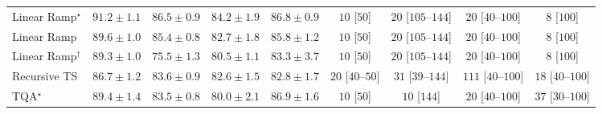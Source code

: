\begin{tabular}{l|cccc|cccc|}
Linear Ramp$^\star$ & {\cellcolor[HTML]{00472A}} \color[HTML]{F1F1F1} $91.2\pm 1.1$ & {\cellcolor[HTML]{026A38}} \color[HTML]{F1F1F1} $86.5\pm 0.9$ & {\cellcolor[HTML]{14783E}} \color[HTML]{F1F1F1} $84.2\pm 1.9$ & {\cellcolor[HTML]{006837}} \color[HTML]{F1F1F1} $86.8\pm 0.9$ & {\cellcolor[HTML]{FFF7F3}} \color[HTML]{000000} $10$ [$50$] & {\cellcolor[HTML]{FFF4F0}} \color[HTML]{000000} $20$ [$105$--$144$] & {\cellcolor[HTML]{FFF4F0}} \color[HTML]{000000} $20$ [$40$--$100$] & {\cellcolor[HTML]{FFF7F3}} \color[HTML]{000000} $8$ [$100$] \\
Linear Ramp & {\cellcolor[HTML]{00532F}} \color[HTML]{F1F1F1} $89.6\pm 1.0$ & {\cellcolor[HTML]{0B713B}} \color[HTML]{F1F1F1} $85.4\pm 0.8$ & {\cellcolor[HTML]{1F8142}} \color[HTML]{F1F1F1} $82.7\pm 1.8$ & {\cellcolor[HTML]{086E3A}} \color[HTML]{F1F1F1} $85.8\pm 1.2$ & {\cellcolor[HTML]{FFF7F3}} \color[HTML]{000000} $10$ [$50$] & {\cellcolor[HTML]{FFF4F0}} \color[HTML]{000000} $20$ [$105$--$144$] & {\cellcolor[HTML]{FFF4F0}} \color[HTML]{000000} $20$ [$40$--$100$] & {\cellcolor[HTML]{FFF7F3}} \color[HTML]{000000} $8$ [$100$] \\
Linear Ramp$^\dagger$ & {\cellcolor[HTML]{005530}} \color[HTML]{F1F1F1} $89.3\pm 1.0$ & {\cellcolor[HTML]{58B669}} \color[HTML]{F1F1F1} $75.5\pm 1.3$ & {\cellcolor[HTML]{2E924C}} \color[HTML]{F1F1F1} $80.5\pm 1.1$ & {\cellcolor[HTML]{1A7D40}} \color[HTML]{F1F1F1} $83.3\pm 3.7$ & {\cellcolor[HTML]{FFF7F3}} \color[HTML]{000000} $10$ [$50$] & {\cellcolor[HTML]{FFF4F0}} \color[HTML]{000000} $20$ [$105$--$144$] & {\cellcolor[HTML]{FFF4F0}} \color[HTML]{000000} $20$ [$40$--$100$] & {\cellcolor[HTML]{FFF7F3}} \color[HTML]{000000} $8$ [$100$] \\
Recursive TS & {\cellcolor[HTML]{016937}} \color[HTML]{F1F1F1} $86.7\pm 1.2$ & {\cellcolor[HTML]{187B3F}} \color[HTML]{F1F1F1} $83.6\pm 0.9$ & {\cellcolor[HTML]{208242}} \color[HTML]{F1F1F1} $82.6\pm 1.5$ & {\cellcolor[HTML]{1F8142}} \color[HTML]{F1F1F1} $82.8\pm 1.7$ & {\cellcolor[HTML]{FFF4F0}} \color[HTML]{000000} $20$ [$40$--$50$] & {\cellcolor[HTML]{FFF2EE}} \color[HTML]{000000} $31$ [$39$--$144$] & {\cellcolor[HTML]{FDE0DD}} \color[HTML]{000000} $111$ [$40$--$100$] & {\cellcolor[HTML]{FFF5F1}} \color[HTML]{000000} $18$ [$40$--$100$] \\
TQA$^\star$ & {\cellcolor[HTML]{005530}} \color[HTML]{F1F1F1} $89.4\pm 1.4$ & {\cellcolor[HTML]{197C40}} \color[HTML]{F1F1F1} $83.5\pm 0.8$ & {\cellcolor[HTML]{31974F}} \color[HTML]{F1F1F1} $80.0\pm 2.1$ & {\cellcolor[HTML]{006837}} \color[HTML]{F1F1F1} $86.9\pm 1.6$ & {\cellcolor[HTML]{FFF7F3}} \color[HTML]{000000} $10$ [$50$] & {\cellcolor[HTML]{FFF7F3}} \color[HTML]{000000} $10$ [$144$] & {\cellcolor[HTML]{FFF4F0}} \color[HTML]{000000} $20$ [$40$--$100$] & {\cellcolor[HTML]{FEF1ED}} \color[HTML]{000000} $37$ [$30$--$100$] \\

\end{tabular}

